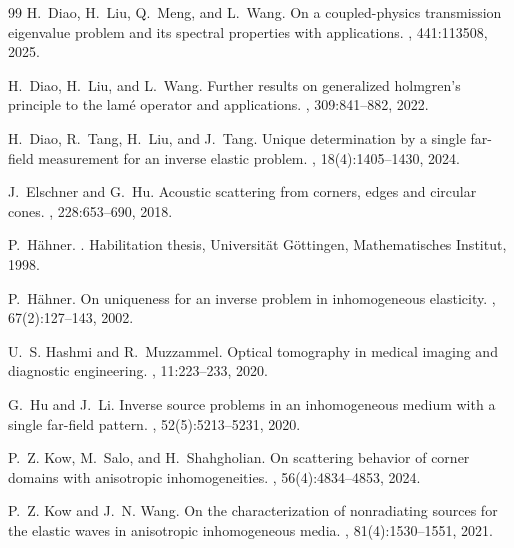 \documentclass[11pt,reqno,oneside]{amsart}
\theoremstyle{definition}
\theoremstyle{remark}
\numberwithin{equation}{section}
\numberwithin{equation}{section}
\theoremstyle{remark}
\begin{document}
\begin{thebibliography}{99}
	H.~Diao, H.~Liu, Q.~Meng, and L.~Wang.
	\newblock On a coupled-physics transmission eigenvalue problem and its spectral
	properties with applications.
	, 441:113508, 2025.
	
	H.~Diao, H.~Liu, and L.~Wang.
	\newblock Further results on generalized holmgren's principle to the lam{\'e}
	operator and applications.
	, 309:841--882, 2022.
	
	H.~Diao, R.~Tang, H.~Liu, and J.~Tang.
	\newblock Unique determination by a single far-field measurement for an inverse
	elastic problem.
	, 18(4):1405--1430, 2024.
	
	J.~Elschner and G.~Hu.
	\newblock Acoustic scattering from corners, edges and circular cones.
	, 228:653--690,
	2018.
	
	P.~H{\"a}hner.
	.
	\newblock Habilitation thesis, Universit{\"a}t G{\"o}ttingen, Mathematisches
	Institut, 1998.
	
	P.~H{\"a}hner.
	\newblock On uniqueness for an inverse problem in inhomogeneous elasticity.
	, 67(2):127--143, 2002.
	
	U.~S. Hashmi and R.~Muzzammel.
	\newblock Optical tomography in medical imaging and diagnostic engineering.
	,
	11:223--233, 2020.
	
	G.~Hu and J.~Li.
	\newblock Inverse source problems in an inhomogeneous medium with a single
	far-field pattern.
	, 52(5):5213--5231, 2020.
	
	P.~Z. Kow, M.~Salo, and H.~Shahgholian.
	\newblock On scattering behavior of corner domains with anisotropic
	inhomogeneities.
	, 56(4):4834--4853, 2024.
	
	P.~Z. Kow and J.~N. Wang.
	\newblock On the characterization of nonradiating sources for the elastic waves
	in anisotropic inhomogeneous media.
	, 81(4):1530--1551, 2021.
	

\end{thebibliography}
\end{document}
